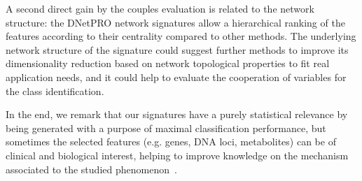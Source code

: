 \documentclass{standalone}
\begin{document}
A second direct gain by the couples evaluation is related to the network structure: the \textsf{DNetPRO} network signatures allow a hierarchical ranking of the features according to their centrality compared to other methods.
The underlying network structure of the signature could suggest further methods to improve its dimensionality reduction based on network topological properties to fit real application needs, and it could help to evaluate the cooperation of variables for the class identification.

In the end, we remark that our signatures have a purely statistical relevance by being generated with a purpose of maximal classification performance, but sometimes the selected features (e.g. genes, DNA loci, metabolites) can be of clinical and biological interest, helping to improve knowledge on the mechanism associated to the studied phenomenon~\cite{PMrna, Scotlandi2009, PMgene, Terragna}.
\end{document}
